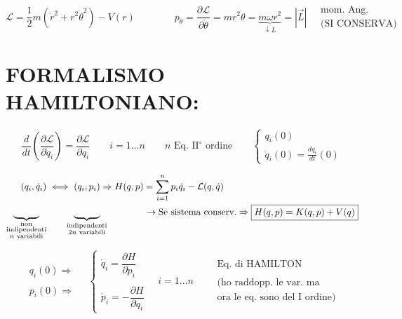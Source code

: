 \documentclass[12pt,a4paper]{article}
\begin{document}
\begin{equation*}
    \mathcal{L} = \frac{1}{2}m(\dot{r}^2 + r^2\dot{\theta}^2) - V(r) \qquad \qquad p_\theta = \frac{\partial \mathcal{L}}{\partial \dot{\theta}} = mr^2\dot{\theta} = \underbrace{m\omega r^2}_{\downarrow L} = |\vec{L}| \quad \begin{matrix} \text{mom. Ang.} \\ \text{(SI CONSERVA)} \end{matrix}
\end{equation*}

\newpage
\section*{FORMALISMO HAMILTONIANO:}

\begin{equation*}
    \frac{d}{dt}\left(\frac{\partial \mathcal{L}}{\partial \dot{q}_i}\right) = \frac{\partial \mathcal{L}}{\partial q_i} \qquad i = 1 \dots n \qquad n \text{ Eq. II}^\circ \text{ ordine} \qquad \begin{cases} q_i(0) \\ \dot{q}_i(0) = \frac{dq_i}{dt}(0) \end{cases}
\end{equation*}

\vspace{0.5cm}
\begin{align*}
    (q_i, \dot{q}_i) &\iff (q_i, p_i) \Rightarrow H(q,p) = \sum_{i=1}^n p_i \dot{q}_i - \mathcal{L}(q, \dot{q}) \\
    \underbrace{\hphantom{(q_i, \dot{q}_i)}}_{\substack{\text{non} \\ \text{indipendenti} \\ n \text{ variabili}}} & \qquad \underbrace{\hphantom{(q_i, p_i)}}_{\substack{\text{indipendenti} \\ 2n \text{ variabili}}} \qquad\qquad \rightarrow \text{Se sistema conserv.} \Rightarrow \boxed{H(q,p) = K(q,p) + V(q)}
\end{align*}

\vspace{0.5cm}
\begin{equation*}
    \begin{matrix}
        q_i(0) \Rightarrow \\
        \\
        p_i(0) \Rightarrow
    \end{matrix} \quad 
    \begin{cases} 
        \dot{q}_i = \dfrac{\partial H}{\partial p_i} \\ \\
        \dot{p}_i = -\dfrac{\partial H}{\partial q_i} 
    \end{cases} \quad i = 1 \dots n \qquad 
    \begin{matrix}
        \text{Eq. di HAMILTON} \\
        \\
        \text{(ho raddopp. le var. ma} \\ 
        \text{ora le eq. sono del I ordine)}
    \end{matrix}
\end{equation*}
\end{document}
